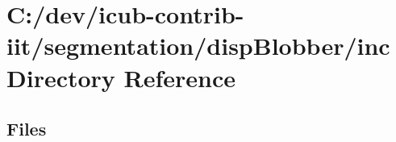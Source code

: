 \section{C\+:/dev/icub-\/contrib-\/iit/segmentation/disp\+Blobber/inc Directory Reference}
\label{dir_3706f863617efa333bb76cf87b4da858}
\subsection*{Files}
\begin{DoxyCompactItemize}
\end{DoxyCompactItemize}
